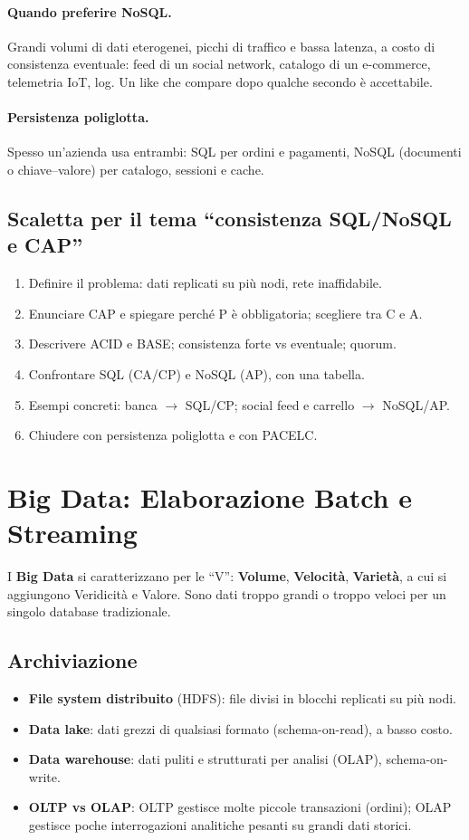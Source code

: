 \paragraph{Quando preferire NoSQL.} Grandi volumi di dati eterogenei, picchi di traffico e bassa latenza, a costo di consistenza eventuale: feed di un social network, catalogo di un e-commerce, telemetria IoT, log. Un like che compare dopo qualche secondo è accettabile.

\paragraph{Persistenza poliglotta.} Spesso un'azienda usa entrambi: SQL per ordini e pagamenti, NoSQL (documenti o chiave--valore) per catalogo, sessioni e cache.

\subsection{Scaletta per il tema ``consistenza SQL/NoSQL e CAP''}
\begin{enumerate}
    \item Definire il problema: dati replicati su più nodi, rete inaffidabile.
    \item Enunciare CAP e spiegare perché P è obbligatoria; scegliere tra C e A.
    \item Descrivere ACID e BASE; consistenza forte vs eventuale; quorum.
    \item Confrontare SQL (CA/CP) e NoSQL (AP), con una tabella.
    \item Esempi concreti: banca $\to$ SQL/CP; social feed e carrello $\to$ NoSQL/AP.
    \item Chiudere con persistenza poliglotta e con PACELC.
\end{enumerate}

\section{Big Data: Elaborazione Batch e Streaming}
I \textbf{Big Data} si caratterizzano per le ``V'': \textbf{Volume}, \textbf{Velocità}, \textbf{Varietà}, a cui si aggiungono Veridicità e Valore. Sono dati troppo grandi o troppo veloci per un singolo database tradizionale.

\subsection{Archiviazione}
\begin{itemize}
    \item \textbf{File system distribuito} (HDFS): file divisi in blocchi replicati su più nodi.
    \item \textbf{Data lake}: dati grezzi di qualsiasi formato (schema-on-read), a basso costo.
    \item \textbf{Data warehouse}: dati puliti e strutturati per analisi (OLAP), schema-on-write.
    \item \textbf{OLTP vs OLAP}: OLTP gestisce molte piccole transazioni (ordini); OLAP gestisce poche interrogazioni analitiche pesanti su grandi dati storici.
\end{itemize}

